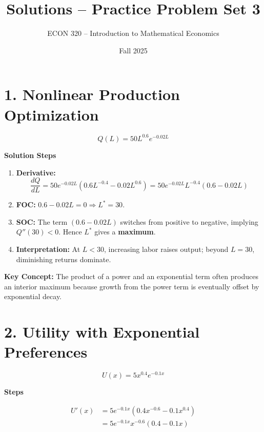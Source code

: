 \documentclass[12pt]{article}
\title{Solutions -- Practice Problem Set 3}
\author{ECON 320 -- Introduction to Mathematical Economics}
\date{Fall 2025}
\begin{document}
\maketitle



\section*{1. Nonlinear Production Optimization}

\[
Q(L)=50L^{0.6}e^{-0.02L}
\]

\textbf{Solution Steps}

\begin{enumerate}
\item \textbf{Derivative:}
\[
\frac{dQ}{dL}=50e^{-0.02L}\left(0.6L^{-0.4}-0.02L^{0.6}\right)
=50e^{-0.02L}L^{-0.4}(0.6-0.02L)
\]

\item \textbf{FOC:} \(0.6-0.02L=0 \Rightarrow L^*=30\).

\item \textbf{SOC:} The term \((0.6-0.02L)\) switches from positive to negative, implying \(Q''(30)<0\).  
Hence \(L^*\) gives a \textbf{maximum}.

\item \textbf{Interpretation:}  
At \(L<30\), increasing labor raises output; beyond \(L=30\), diminishing returns dominate.

\end{enumerate}

\begin{tcolorbox}
\textbf{Key Concept:} The product of a power and an exponential term often produces an interior maximum because growth from the power term is eventually offset by exponential decay.
\end{tcolorbox}

\newpage

\section*{2. Utility with Exponential Preferences}

\[
U(x)=5x^{0.4}e^{-0.1x}
\]

\textbf{Steps}

\begin{align*}
U'(x) &= 5e^{-0.1x}(0.4x^{-0.6}-0.1x^{0.4}) \\
&= 5e^{-0.1x}x^{-0.6}(0.4-0.1x)
\end{align*}
\end{document}
